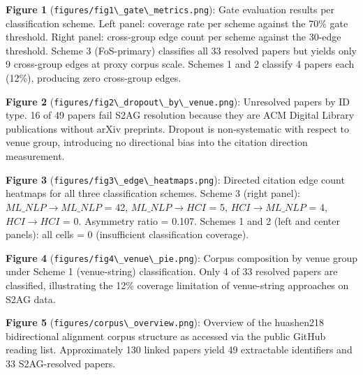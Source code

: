 
\textbf{Figure 1} (\texttt{figures/fig1\textbackslash \_gate\textbackslash \_metrics.png}): Gate evaluation results per classification scheme. Left panel: coverage rate per scheme against the 70\% gate threshold. Right panel: cross-group edge count per scheme against the 30-edge threshold. Scheme 3 (FoS-primary) classifies all 33 resolved papers but yields only 9 cross-group edges at proxy corpus scale. Schemes 1 and 2 classify 4 papers each (12\%), producing zero cross-group edges.

\textbf{Figure 2} (\texttt{figures/fig2\textbackslash \_dropout\textbackslash \_by\textbackslash \_venue.png}): Unresolved papers by ID type. 16 of 49 papers fail S2AG resolution because they are ACM Digital Library publications without arXiv preprints. Dropout is non-systematic with respect to venue group, introducing no directional bias into the citation direction measurement.

\textbf{Figure 3} (\texttt{figures/fig3\textbackslash \_edge\textbackslash \_heatmaps.png}): Directed citation edge count heatmaps for all three classification schemes. Scheme 3 (right panel): $ML\_NLP\rightarrow ML\_NLP$ = 42, $ML\_NLP\rightarrow HCI$ = 5, $HCI\rightarrow ML\_NLP$ = 4, $HCI\rightarrow HCI$ = 0. Asymmetry ratio = 0.107. Schemes 1 and 2 (left and center panels): all cells = 0 (insufficient classification coverage).

\textbf{Figure 4} (\texttt{figures/fig4\textbackslash \_venue\textbackslash \_pie.png}): Corpus composition by venue group under Scheme 1 (venue-string) classification. Only 4 of 33 resolved papers are classified, illustrating the 12\% coverage limitation of venue-string approaches on S2AG data.

\textbf{Figure 5} (\texttt{figures/corpus\textbackslash \_overview.png}): Overview of the huashen218 bidirectional alignment corpus structure as accessed via the public GitHub reading list. Approximately 130 linked papers yield 49 extractable identifiers and 33 S2AG-resolved papers.
